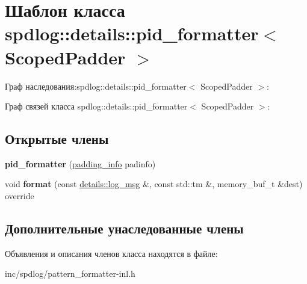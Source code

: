 \hypertarget{classspdlog_1_1details_1_1pid__formatter}{}\section{Шаблон класса spdlog\+:\+:details\+:\+:pid\+\_\+formatter$<$ Scoped\+Padder $>$}
\label{classspdlog_1_1details_1_1pid__formatter}


Граф наследования\+:spdlog\+:\+:details\+:\+:pid\+\_\+formatter$<$ Scoped\+Padder $>$\+:


Граф связей класса spdlog\+:\+:details\+:\+:pid\+\_\+formatter$<$ Scoped\+Padder $>$\+:
\subsection*{Открытые члены}
\begin{DoxyCompactItemize}
\item 
\mbox{\label{classspdlog_1_1details_1_1pid__formatter_a7c766c8c3cee871f9bec5be21fc4e1d8}} 
{\bfseries pid\+\_\+formatter} (\hyperlink{structspdlog_1_1details_1_1padding__info}{padding\+\_\+info} padinfo)
\item 
\mbox{\label{classspdlog_1_1details_1_1pid__formatter_a42ad11ddf5be8a8837367ffe3e9273e4}} 
void {\bfseries format} (const \hyperlink{structspdlog_1_1details_1_1log__msg}{details\+::log\+\_\+msg} \&, const std\+::tm \&, memory\+\_\+buf\+\_\+t \&dest) override
\end{DoxyCompactItemize}
\subsection*{Дополнительные унаследованные члены}


Объявления и описания членов класса находятся в файле\+:\begin{DoxyCompactItemize}
\item 
inc/spdlog/pattern\+\_\+formatter-\/inl.\+h\end{DoxyCompactItemize}
